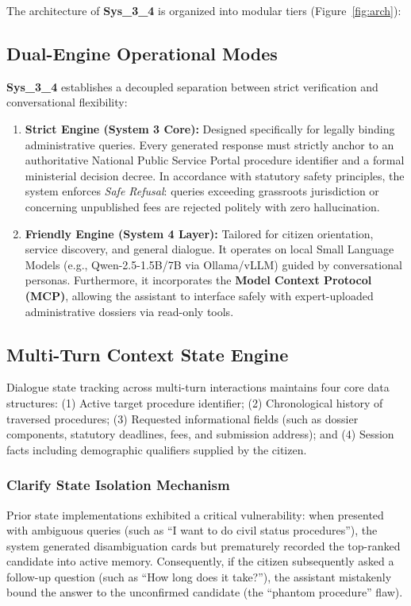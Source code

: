 \documentclass[11pt,a4paper]{article}
\begin{document}
The architecture of \textbf{Sys\_3\_4} is organized into modular tiers (Figure~\ref{fig:arch}):

\subsection{Dual-Engine Operational Modes}
\textbf{Sys\_3\_4} establishes a decoupled separation between strict verification and conversational flexibility:
\begin{enumerate}
    \item \textbf{Strict Engine (System 3 Core):} Designed specifically for legally binding administrative queries. Every generated response must strictly anchor to an authoritative National Public Service Portal procedure identifier and a formal ministerial decision decree. In accordance with statutory safety principles, the system enforces \textit{Safe Refusal}: queries exceeding grassroots jurisdiction or concerning unpublished fees are rejected politely with zero hallucination.
    \item \textbf{Friendly Engine (System 4 Layer):} Tailored for citizen orientation, service discovery, and general dialogue. It operates on local Small Language Models (e.g., Qwen-2.5-1.5B/7B via Ollama/vLLM) guided by conversational personas. Furthermore, it incorporates the \textbf{Model Context Protocol (MCP)}, allowing the assistant to interface safely with expert-uploaded administrative dossiers via read-only tools.
\end{enumerate}

\subsection{Multi-Turn Context State Engine}
Dialogue state tracking across multi-turn interactions maintains four core data structures: (1) Active target procedure identifier; (2) Chronological history of traversed procedures; (3) Requested informational fields (such as dossier components, statutory deadlines, fees, and submission address); and (4) Session facts including demographic qualifiers supplied by the citizen.

\subsubsection{Clarify State Isolation Mechanism}
Prior state implementations exhibited a critical vulnerability: when presented with ambiguous queries (such as ``I want to do civil status procedures''), the system generated disambiguation cards but prematurely recorded the top-ranked candidate into active memory. Consequently, if the citizen subsequently asked a follow-up question (such as ``How long does it take?''), the assistant mistakenly bound the answer to the unconfirmed candidate (the ``phantom procedure'' flaw).
\end{document}
